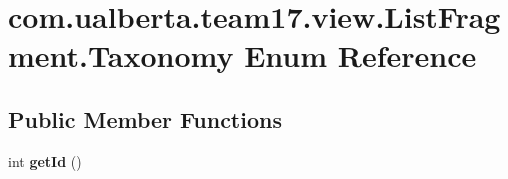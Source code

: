 \hypertarget{enumcom_1_1ualberta_1_1team17_1_1view_1_1_list_fragment_1_1_taxonomy}{\section{com.\+ualberta.\+team17.\+view.\+List\+Fragment.\+Taxonomy Enum Reference}
\label{enumcom_1_1ualberta_1_1team17_1_1view_1_1_list_fragment_1_1_taxonomy}
}
\subsection*{Public Member Functions}
\begin{DoxyCompactItemize}
\item 
\hypertarget{enumcom_1_1ualberta_1_1team17_1_1view_1_1_list_fragment_1_1_taxonomy_ae3d0653a576bf077a4093914a4a46d68}{int {\bfseries get\+Id} ()}\label{enumcom_1_1ualberta_1_1team17_1_1view_1_1_list_fragment_1_1_taxonomy_ae3d0653a576bf077a4093914a4a46d68}

\end{DoxyCompactItemize}
